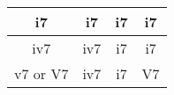 

\begin{tabular}{| c | c | c | c |}
		\hline
		\phantom{x}i7\phantom{x} & \phantom{x}i7\phantom{x} & \phantom{x}i7\phantom{x} & \phantom{x}i7\phantom{x}  \\
		\hline
		\phantom{x}iv7\phantom{x} & \phantom{x}iv7\phantom{x} & \phantom{x}i7\phantom{x} & \phantom{x}i7\phantom{x}  \\
		\hline
		v7 or V7 & \phantom{x}iv7\phantom{x} & \phantom{x}i7\phantom{x} & \phantom{x}V7\phantom{x}  \\
		\hline
\end{tabular}




